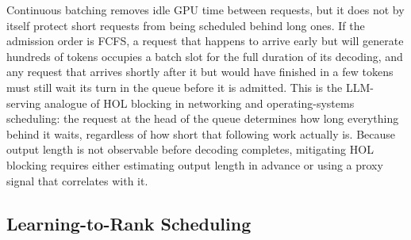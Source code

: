 Continuous batching removes idle GPU time between requests, but it does not
by itself protect short requests from being scheduled behind long ones. If the
admission order is FCFS, a request that happens to arrive early but will
generate hundreds of tokens occupies a batch slot for the full duration of its
decoding, and any request that arrives shortly after it but would have
finished in a few tokens must still wait its turn in the queue before it is
admitted. This is the LLM-serving analogue of HOL blocking in networking and
operating-systems scheduling: the request at the head of the queue determines
how long everything behind it waits, regardless of how short that following
work actually is. Because output length is not observable before decoding
completes, mitigating HOL blocking requires either estimating output length in
advance or using a proxy signal that correlates with it.

\subsection{Learning-to-Rank Scheduling}
\label{subsec:ltr-background}

